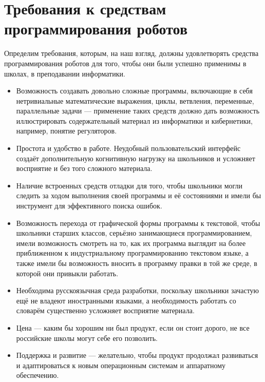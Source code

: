 \documentclass[a4paper]{article}
\begin{document}
\section{Требования к средствам программирования роботов }
Определим требования, которым, на наш взгляд, должны удовлетворять средства программирования роботов для того, чтобы они были успешно применимы в школах, в преподавании информатики.
\begin{itemize}
  \item Возможность создавать довольно сложные программы, включающие в себя нетривиальные математические выражения, циклы, ветвления, переменные, параллельные задачи --- применение таких средств должно дать возможность иллюстрировать содержательный материал из информатики и кибернетики, например, понятие регуляторов.
  \item Простота и удобство в работе. Неудобный пользовательский интерфейс создаёт дополнительную когнитивную нагрузку на школьников и усложняет восприятие и без того сложного материала.
  \item Наличие встроенных средств отладки для того, чтобы школьники могли следить за ходом выполнения своей программы и её состояниями и имели бы инструмент для эффективного поиска ошибок.
  \item Возможность перехода от графической формы программы к текстовой, чтобы школьники старших классов, серьёзно занимающиеся программированием, имели возможность смотреть на то, как их программа выглядит на более приближенном к индустриальному программированию текстовом языке, а также имели бы возможность вносить в программу правки в той же среде, в которой они привыкли работать.
  \item Необходима русскоязычная среда разработки, поскольку школьники зачастую ещё не владеют иностранными языками, а необходимость работать со словарём существенно усложняет восприятие материала.
  \item Цена --- каким бы хорошим ни был продукт, если он стоит дорого, не все российские школы могут себе его позволить.
  \item Поддержка и развитие --- желательно, чтобы продукт продолжал развиваться и адаптироваться к новым операционным системам и аппаратному обеспечению.
\end{itemize}
\end{document}
